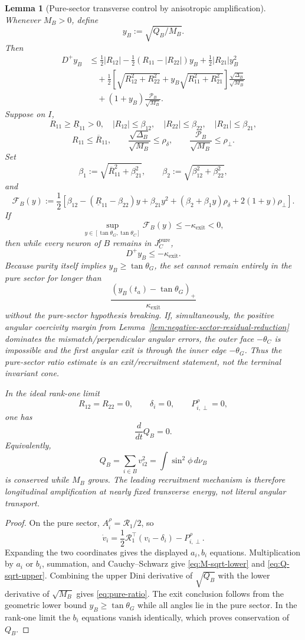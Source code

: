 \documentclass{article} %
\theoremstyle{plain}
\newtheorem{lemma}[theorem]{Lemma}
\theoremstyle{definition}
\theoremstyle{remark}
\begin{document}
\begin{lemma}[Pure-sector transverse control by anisotropic amplification]
Whenever $M_B>0$, define
\[
\boxed{
y_B:=\sqrt{Q_B/M_B}.}
\]
Then
\[
\boxed{
\begin{aligned}
D^+y_B
&\le
\frac12|R_{12}|
-
\frac12(R_{11}-|R_{22}|)y_B
+
\frac12|R_{21}|y_B^2
\\
&\quad
+
\frac12
\left[
\sqrt{R_{12}^2+R_{22}^2}
+
y_B\sqrt{R_{11}^2+R_{21}^2}
\right]
\frac{\sqrt{\Delta_B}}{\sqrt{M_B}}
\\
&\quad
+(1+y_B)
\frac{\mathcal P_B}{\sqrt{M_B}}.
\end{aligned}
}
\tag{pure-ratio}\label{eq:pure-ratio}
\]
Suppose on $I$,
\[
R_{11}\ge\underline R_{11}>0,
\quad
|R_{12}|\le\beta_{12},
\quad
|R_{22}|\le\beta_{22},
\quad
|R_{21}|\le\beta_{21},
\]
\[
R_{11}\le\overline R_{11},
\qquad
\frac{\sqrt{\Delta_B}}{\sqrt{M_B}}\le\rho_\delta,
\qquad
\frac{\mathcal P_B}{\sqrt{M_B}}\le\rho_\perp.
\]
Set
\[
\beta_1:=\sqrt{\overline R_{11}^2+\beta_{21}^2},
\qquad
\beta_2:=\sqrt{\beta_{12}^2+\beta_{22}^2},
\]
and
\[
\boxed{
\mathcal F_B(y)
:=
\frac12
\left[
\beta_{12}
-(\underline R_{11}-\beta_{22})y
+\beta_{21}y^2
+(\beta_2+\beta_1y)\rho_\delta
+2(1+y)\rho_\perp
\right].
}
\]
If
\[
\sup_{y\in[\tan\theta_G,\tan\theta_C]}
\mathcal F_B(y)
\le
-\kappa_{\mathrm{exit}}<0,
\]
then while every neuron of $B$ remains in $J_C^{\mathrm{pure}}$,
\[
D^+y_B\le-\kappa_{\mathrm{exit}}.
\]
Because purity itself implies $y_B\ge\tan\theta_G$, the set cannot remain
entirely in the pure sector for longer than
\[
\boxed{
\frac{
(y_B(t_a)-\tan\theta_G)_+
}{\kappa_{\mathrm{exit}}}
}
\]
without the pure-sector hypothesis breaking.  If, simultaneously, the
positive angular coercivity margin from
Lemma~\ref{lem:negative-sector-residual-reduction} dominates the
mismatch/perpendicular angular errors, the outer face $-\theta_C$ is
impossible and the first angular exit is through the inner edge
$-\theta_G$.  Thus the pure-sector ratio estimate is an exit/recruitment
statement, not the terminal invariant cone.

In the ideal rank-one limit
\[
R_{12}=R_{22}=0,
\qquad
\delta_i=0,
\qquad
P_{i,\perp}^\rho=0,
\]
one has
\[
\boxed{
\frac d{dt}Q_B=0.
}
\]
Equivalently,
\[
Q_B
=
\sum_{i\in B}v_{i2}^2
=
\int\sin^2\phi\,d\nu_B
\]
is conserved while $M_B$ grows.  The leading recruitment mechanism is
therefore longitudinal amplification at nearly fixed transverse energy,
not literal angular transport.
\end{lemma}

\begin{proof}
On the pure sector,
$A_i^\rho=\mathcal R_1/2$, so
\[
\dot v_i
=
\frac12\mathcal R_1^\top(v_i-\delta_i)
-
P_{i,\perp}^\rho.
\]
Expanding the two coordinates gives the displayed $a_i,b_i$ equations.
Multiplication by $a_i$ or $b_i$, summation, and Cauchy--Schwarz give
\eqref{eq:M-sqrt-lower} and \eqref{eq:Q-sqrt-upper}.  Combining the upper
Dini derivative of $\sqrt{Q_B}$ with the lower derivative of
$\sqrt{M_B}$ gives \eqref{eq:pure-ratio}.  The exit conclusion follows from
the geometric lower bound $y_B\ge\tan\theta_G$ while all angles lie in the
pure sector.  In the rank-one limit the $b_i$ equations vanish identically,
which proves conservation of $Q_B$.
\end{proof}
\end{document}
